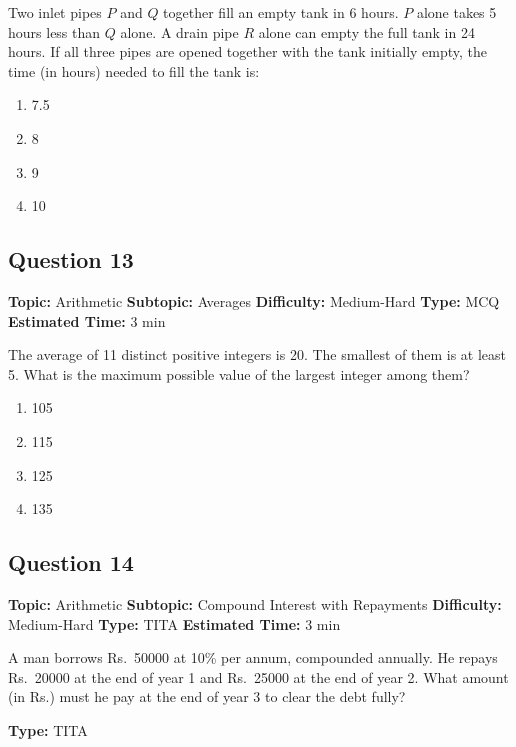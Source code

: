 \documentclass[11pt]{article}
\begin{document}
\begin{tcolorbox}
Two inlet pipes $P$ and $Q$ together fill an empty tank in 6 hours. $P$ alone takes 5 hours less than $Q$ alone. A drain pipe $R$ alone can empty the full tank in 24 hours. If all three pipes are opened together with the tank initially empty, the time (in hours) needed to fill the tank is:
\end{tcolorbox}
\begin{enumerate}[label=(\Alph*)]
\item 7.5
\item 8
\item 9
\item 10
\end{enumerate}

\subsection*{Question 13}
\textbf{Topic:} Arithmetic \quad \textbf{Subtopic:} Averages \quad \textbf{Difficulty:} Medium-Hard \quad \textbf{Type:} MCQ \quad \textbf{Estimated Time:} 3 min

\begin{tcolorbox}
The average of 11 distinct positive integers is 20. The smallest of them is at least 5. What is the maximum possible value of the largest integer among them?
\end{tcolorbox}
\begin{enumerate}[label=(\Alph*)]
\item 105
\item 115
\item 125
\item 135
\end{enumerate}

\subsection*{Question 14}
\textbf{Topic:} Arithmetic \quad \textbf{Subtopic:} Compound Interest with Repayments \quad \textbf{Difficulty:} Medium-Hard \quad \textbf{Type:} TITA \quad \textbf{Estimated Time:} 3 min

\begin{tcolorbox}
A man borrows Rs.\ 50000 at 10\% per annum, compounded annually. He repays Rs.\ 20000 at the end of year 1 and Rs.\ 25000 at the end of year 2. What amount (in Rs.) must he pay at the end of year 3 to clear the debt fully?
\end{tcolorbox}
\textbf{Type:} TITA
\end{document}
